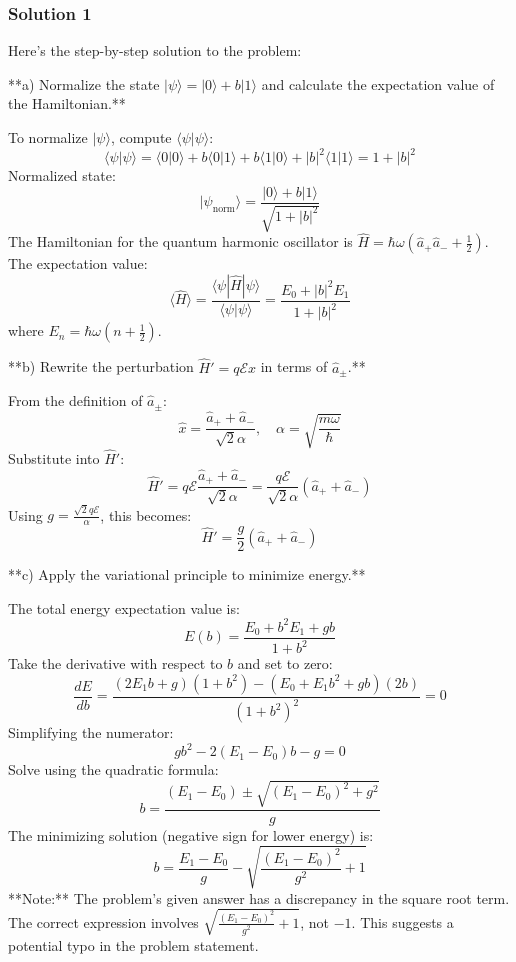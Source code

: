 \documentclass{article}
\begin{document}
\subsubsection{Solution 1}
Here's the step-by-step solution to the problem:

**a) Normalize the state \(|\psi\rangle = |0\rangle + b |1\rangle\) and calculate the expectation value of the Hamiltonian.**

To normalize \(|\psi\rangle\), compute \(\langle \psi | \psi \rangle\):
\[
\langle \psi | \psi \rangle = \langle 0|0\rangle + b\langle 0|1\rangle + b\langle 1|0\rangle + |b|^2\langle 1|1\rangle = 1 + |b|^2
\]
Normalized state:
\[
|\psi_{\text{norm}}\rangle = \frac{|0\rangle + b|1\rangle}{\sqrt{1 + |b|^2}}
\]
The Hamiltonian for the quantum harmonic oscillator is \(\hat{H} = \hbar\omega\left(\hat{a}_+\hat{a}_- + \frac{1}{2}\right)\). The expectation value:
\[
\langle \hat{H} \rangle = \frac{\langle \psi | \hat{H} | \psi \rangle}{\langle \psi | \psi \rangle} = \frac{E_0 + |b|^2 E_1}{1 + |b|^2}
\]
where \(E_n = \hbar\omega\left(n + \frac{1}{2}\right)\).

**b) Rewrite the perturbation \(\hat{H}' = q\mathcal{E}\hat{x}\) in terms of \(\hat{a}_\pm\).**

From the definition of \(\hat{a}_\pm\):
\[
\hat{x} = \frac{\hat{a}_+ + \hat{a}_-}{\sqrt{2}\alpha}, \quad \alpha = \sqrt{\frac{m\omega}{\hbar}}
\]
Substitute into \(\hat{H}'\):
\[
\hat{H}' = q\mathcal{E} \frac{\hat{a}_+ + \hat{a}_-}{\sqrt{2}\alpha} = \frac{q\mathcal{E}}{\sqrt{2}\alpha} (\hat{a}_+ + \hat{a}_-)
\]
Using \(g = \frac{\sqrt{2}q\mathcal{E}}{\alpha}\), this becomes:
\[
\hat{H}' = \frac{g}{2} (\hat{a}_+ + \hat{a}_-)
\]

**c) Apply the variational principle to minimize energy.**

The total energy expectation value is:
\[
E(b) = \frac{E_0 + b^2 E_1 + g b}{1 + b^2}
\]
Take the derivative with respect to \(b\) and set to zero:
\[
\frac{dE}{db} = \frac{(2E_1 b + g)(1 + b^2) - (E_0 + E_1 b^2 + g b)(2b)}{(1 + b^2)^2} = 0
\]
Simplifying the numerator:
\[
g b^2 - 2(E_1 - E_0) b - g = 0
\]
Solve using the quadratic formula:
\[
b = \frac{(E_1 - E_0) \pm \sqrt{(E_1 - E_0)^2 + g^2}}{g}
\]
The minimizing solution (negative sign for lower energy) is:
\[
b = \frac{E_1 - E_0}{g} - \sqrt{\frac{(E_1 - E_0)^2}{g^2} + 1}
\]
**Note:** The problem's given answer has a discrepancy in the square root term. The correct expression involves \(\sqrt{\frac{(E_1 - E_0)^2}{g^2} + 1}\), not \(-1\). This suggests a potential typo in the problem statement.
\end{document}
